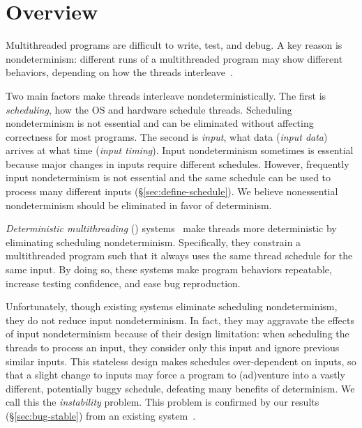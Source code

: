\section{Overview} \label{sec:tern-overview}

Multithreaded programs are difficult to write, test, and debug.  A key
reason is nondeterminism: different runs of a multithreaded
program may show different behaviors, depending on how the threads
interleave~\cite{lee06}.

Two main factors make threads interleave nondeterministically.  The first
is \emph{scheduling}, how the OS and hardware schedule threads.
Scheduling nondeterminism is not essential and can be eliminated without
affecting correctness for most programs.  The second is \emph{input}, what
data (\emph{input data}) arrives at what time (\emph{input timing}).
Input nondeterminism sometimes is essential because major changes in
inputs require different schedules.  However, frequently input
nondeterminism is not essential and the same schedule can be used to
process many different inputs (\S\ref{sec:define-schedule}).  We believe
nonessential nondeterminism should be eliminated in favor of determinism.




\emph{Deterministic multithreading} (\dmt)
systems~\cite{dmp:asplos09,coredet:asplos10,kendo:asplos09} make threads
more deterministic by eliminating scheduling nondeterminism.
Specifically, they constrain a multithreaded program such that it always
uses the same thread schedule for the same input.  By doing so, these
systems make program behaviors repeatable, increase testing confidence,
and ease bug reproduction.

Unfortunately, though existing \dmt systems eliminate scheduling
nondeterminism, they do not reduce input nondeterminism.  In fact, they
may aggravate the effects of input nondeterminism because of their design
limitation: when scheduling the threads to process an input, they consider
only this input and ignore previous similar inputs.  This stateless design
makes schedules over-dependent on inputs, so that a slight change to
inputs may force a program to (ad)venture into a vastly different,
potentially buggy schedule, defeating many benefits of determinism.  We
call this the \emph{instability} problem. 
This problem is confirmed by our results (\S\ref{sec:bug-stable}) from
an existing \dmt system~\cite{coredet:asplos10}.

